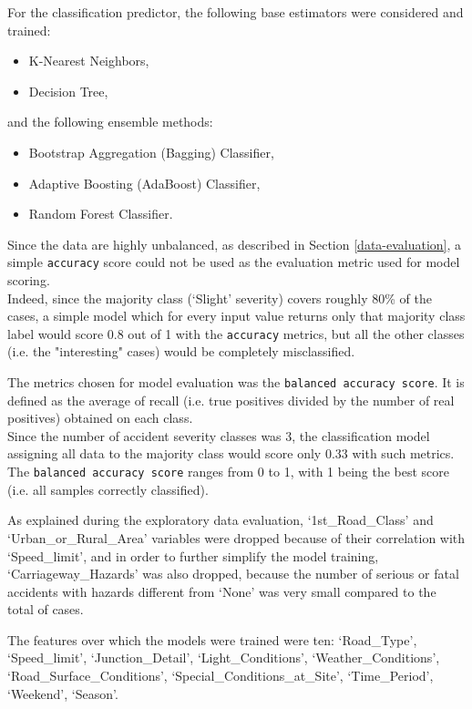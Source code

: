 \documentclass[11pt]{article}
\begin{document}
For the classification predictor, the following base estimators were considered and trained:
\begin{itemize}
\item K-Nearest Neighbors,
\item Decision Tree,
\end{itemize}
and the following ensemble methods:
\begin{itemize}
\item Bootstrap Aggregation (Bagging) Classifier,
\item Adaptive Boosting (AdaBoost) Classifier,
\item Random Forest Classifier.
\end{itemize}

Since the data are highly unbalanced, as described in Section \ref{data-evaluation}, a simple \texttt{accuracy} score could not be used as the evaluation metric used for model scoring.\\
Indeed, since the majority class (`Slight' severity) covers roughly 80\% of the cases, a simple model which for every input value returns only that majority class label would score 0.8 out of 1 with the \texttt{accuracy} metrics, but all the other classes (i.e. the "interesting" cases) would be completely misclassified.

The metrics chosen for model evaluation was the \texttt{balanced accuracy score}. It is defined as the average of recall (i.e. true positives divided by the number of real positives) obtained on each class.\\
Since the number of accident severity classes was 3, the classification model assigning all data to the majority class would score only 0.33 with such metrics. The \texttt{balanced accuracy score} ranges from 0 to 1, with 1 being the best score (i.e. all samples correctly classified).

As explained during the exploratory data evaluation, `1st\_Road\_Class' and `Urban\_or\_Rural\_Area' variables were dropped because of their correlation with `Speed\_limit', and in order to further simplify the model training, `Carriageway\_Hazards' was also dropped, because the number of serious or fatal accidents with hazards different from `None' was very small compared to the total of cases.

The features over which the models were trained were ten: `Road\_Type', `Speed\_limit', `Junction\_Detail', `Light\_Conditions', `Weather\_Conditions', `Road\_Surface\_Conditions', `Special\_Conditions\_at\_Site', `Time\_Period', `Weekend', `Season'.
\end{document}

